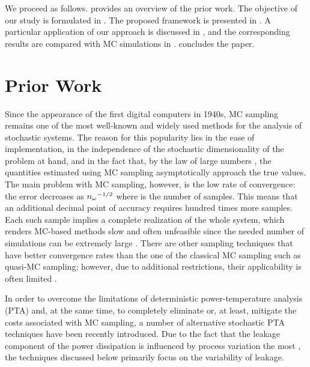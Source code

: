We proceed as follows.  provides an overview of the prior
work. The objective of our study is formulated in . The
proposed framework is presented in . A particular
application of our approach is discussed in , and the
corresponding results are compared with \ac{MC} simulations in
.  concludes the paper.

\section{Prior Work}

Since the appearance of the first digital computers in 1940s, \acf{MC} sampling
remains one of the most well-known and widely used methods for the analysis of
stochastic systems. The reason for this popularity lies in the ease of
implementation, in the independence of the stochastic dimensionality of the
problem at hand, and in the fact that, by the law of large numbers
\cite{durrett2010}, the quantities estimated using \ac{MC} sampling
asymptotically approach the true values. The main problem with \ac{MC} sampling,
however, is the low rate of convergence: the error decreases as ${n_\mathrm{\omega}}^{-1/2}$
where \no is the number of samples. This means that an additional decimal point
of accuracy requires hundred times more samples. Each such sample implies a
complete realization of the whole system, which renders \ac{MC}-based methods
slow and often unfeasible since the needed number of simulations can be
extremely large \cite{diaz-emparanza2002}. There are other sampling techniques
that have better convergence rates than the one of the classical \ac{MC}
sampling such as quasi-\ac{MC} sampling; however, due to additional
restrictions, their applicability is often limited \cite{xiu2010}.

In order to overcome the limitations of deterministic power-temperature analysis
(PTA) and, at the same time, to completely eliminate or, at least, mitigate the
costs associated with MC sampling, a number of alternative stochastic PTA
techniques have been recently introduced. Due to the fact that the leakage
component of the power dissipation is influenced by process variation the most
\cite{chandrakasan2001, srivastava2010, juan2011, juan2012}, the techniques
discussed below primarily focus on the variability of leakage.

